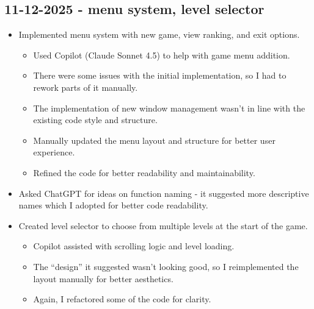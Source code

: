 \documentclass[11pt,a4paper]{article}
\begin{document}
\subsection{11-12-2025 - menu system, level selector}
\begin{itemize}
    \item Implemented menu system with new game, view ranking, and exit options.
    \begin{itemize}
        \item Used Copilot (Claude Sonnet 4.5) to help with game menu addition.
        \item There were some issues with the initial implementation, so I had to rework parts of it manually.
        \item The implementation of new window management wasn't in line with the existing code style and structure.
        \item Manually updated the menu layout and structure for better user experience.
        \item Refined the code for better readability and maintainability.
    \end{itemize}
    
    \item Asked ChatGPT for ideas on function naming - it suggested more descriptive names which I adopted for better code readability.
    
    \item Created level selector to choose from multiple levels at the start of the game.
    \begin{itemize}
        \item Copilot assisted with scrolling logic and level loading.
        \item The ``design'' it suggested wasn't looking good, so I reimplemented the layout manually for better aesthetics.
        \item Again, I refactored some of the code for clarity.
    \end{itemize}
\end{itemize}
\end{document}
